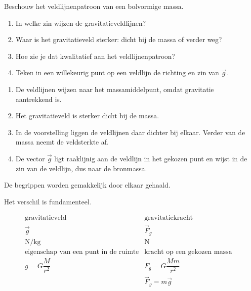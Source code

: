 \documentclass{ximera}
\begin{document}
\begin{oefening}{\oefB\ESS}

Beschouw het veldlijnenpatroon van een bolvormige massa.

\begin{enumerate}
  \item In welke zin wijzen de gravitatieveldlijnen?
  \item Waar is het gravitatieveld sterker: dicht bij de massa of verder
        weg?
  \item Hoe zie je dat kwalitatief aan het veldlijnenpatroon?
  \item Teken in een willekeurig punt op een veldlijn de richting en zin
        van $\vec g$.
\end{enumerate}

\begin{oplossing}

\begin{enumerate}
  \item De veldlijnen wijzen naar het massamiddelpunt, omdat gravitatie
        aantrekkend is.

  \item Het gravitatieveld is sterker dicht bij de massa.

  \item In de voorstelling liggen de veldlijnen daar dichter bij elkaar.
        Verder van de massa neemt de veldsterkte af.

  \item De vector $\vec g$ ligt raaklijnig aan de veldlijn in het gekozen
        punt en wijst in de zin van de veldlijn, dus naar de bronmassa.
\end{enumerate}

\end{oplossing}
\end{oefening}



De begrippen worden gemakkelijk door elkaar gehaald.

Het verschil is fundamenteel.


\begin{center}
\[
\boxed{
\begin{array}{c|c}
\text{gravitatieveld} & \text{gravitatiekracht}\\
\hline
\vec g & \vec F_g\\[1mm]
\mathrm{N/kg} & \mathrm N\\[1mm]
\text{eigenschap van een punt in de ruimte}
&
\text{kracht op een gekozen massa}\\[1mm]
g=G\dfrac{M}{r^2}
&
F_g=G\dfrac{Mm}{r^2}\\[3mm]
&
\vec F_g=m\vec g
\end{array}
}
\]
\end{center}
\end{document}
